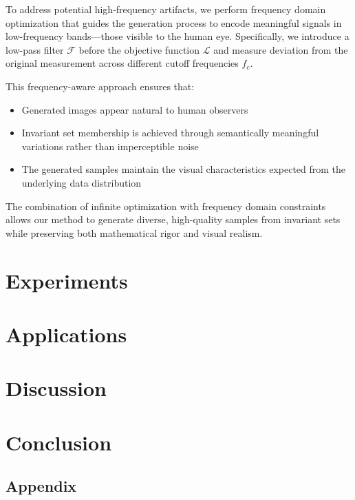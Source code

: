 \documentclass[licencjacka,en]{pracamgr}
\begin{document}
To address potential high-frequency artifacts, we perform frequency domain optimization that guides the generation process to encode meaningful signals in low-frequency bands---those visible to the human eye. Specifically, we introduce a low-pass filter $\mathcal{F}$ before the objective function $\mathcal{L}$ and measure deviation from the original measurement across different cutoff frequencies $f_c$.

This frequency-aware approach ensures that:
\begin{itemize}
  \item Generated images appear natural to human observers
  \item Invariant set membership is achieved through semantically meaningful variations rather than imperceptible noise
  \item The generated samples maintain the visual characteristics expected from the underlying data distribution
\end{itemize}

The combination of infinite optimization with frequency domain constraints allows our method to generate diverse, high-quality samples from invariant sets while preserving both mathematical rigor and visual realism.

\chapter{Experiments}\label{r:experiments}

\chapter{Applications}\label{r:applications}

\chapter{Discussion}\label{r:discussion}

\chapter{Conclusion}\label{r:conclusion}

\appendix
\section{Appendix}
\end{document}
